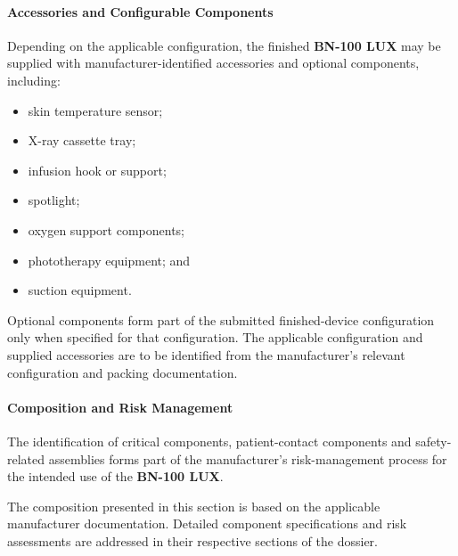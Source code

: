 
\paragraph{Accessories and Configurable Components}

Depending on the applicable configuration, the finished
\textbf{BN-100 LUX} may be supplied with manufacturer-identified
accessories and optional components, including:

\begin{itemize}
    \item skin temperature sensor;
    \item X-ray cassette tray;
    \item infusion hook or support;
    \item spotlight;
    \item oxygen support components;
    \item phototherapy equipment; and
    \item suction equipment.
\end{itemize}

Optional components form part of the submitted finished-device
configuration only when specified for that configuration.
The applicable configuration and supplied accessories are to be
identified from the manufacturer's relevant configuration and
packing documentation.


\paragraph{Composition and Risk Management}

The identification of critical components, patient-contact
components and safety-related assemblies forms part of the
manufacturer's risk-management process for the intended use of the
\textbf{BN-100 LUX}.

The composition presented in this section is based on the
applicable manufacturer documentation. Detailed component
specifications and risk assessments are addressed in their
respective sections of the dossier.

